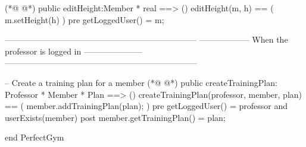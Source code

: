 \begin{vdmpp}[breaklines=true]
(*@
\label{editHeight:302}
@*)
  public editHeight:Member * real ==> ()
 editHeight(m, h) ==  (
  m.setHeight(h)
 ) 
 pre getLoggedUser() = m;
 
 
 
  ---------------------------------------------------------------------
  ------------------ When the professor is logged in ---------------------
  ---------------------------------------------------------------------

 -- Create a training plan for a member
(*@
\label{createTrainingPlan:315}
@*)
 public createTrainingPlan: Professor * Member * Plan ==> ()
 createTrainingPlan(professor, member, plan) == (
   member.addTrainingPlan(plan);
 )
 pre getLoggedUser() = professor and userExists(member)
 post member.getTrainingPlan() = plan;
 
end PerfectGym
\end{vdmpp}
\bigskip
